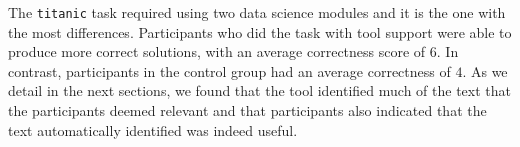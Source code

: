 The \texttt{titanic} task required using two data science modules and it is the one with the most differences. 
Participants who did the task with tool support were able to produce more correct solutions, with an average 
correctness score of $6$. In contrast, participants in the control group had an average correctness of $4$. 
As we detail in the next sections, we found that the tool identified much of the text that the participants deemed relevant
and that participants also indicated that
the text automatically identified was indeed useful.






